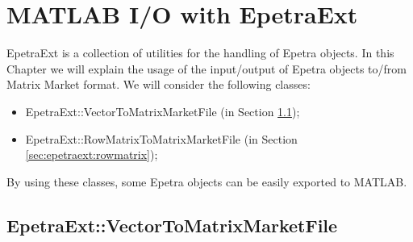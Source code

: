% 
% 
% 
%  
%  
% 

\chapter{MATLAB I/O with EpetraExt}
\label{chap:epetraext}


\begin{introchapter}
EpetraExt is a collection of utilities for the handling of Epetra objects. 
In this
Chapter we will explain the usage of the input/output of Epetra
objects  to/from Matrix Market format. We will consider the following classes:
\begin{itemize}
\item EpetraExt::VectorToMatrixMarketFile (in Section \ref{sec:epetraext:vector});
\item EpetraExt::RowMatrixToMatrixMarketFile (in Section
                                              \ref{sec:epetraext:rowmatrix});
\end{itemize}
By using these classes, some Epetra objects can be easily exported to MATLAB.
\end{introchapter}

\section{EpetraExt::VectorToMatrixMarketFile}
\label{sec:epetraext:vector}

